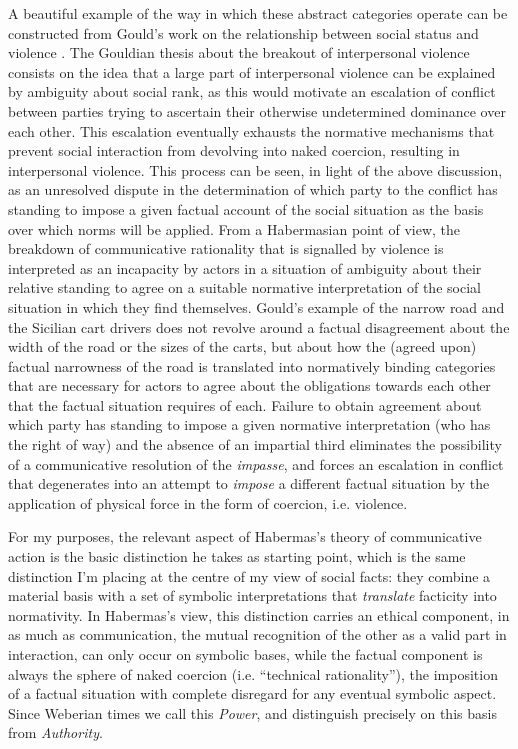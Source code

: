 A beautiful example of the way in which these abstract categories operate can be constructed from Gould's work on the relationship between social status and violence \citep{gould2003a}.
The Gouldian thesis about the breakout of interpersonal violence consists on the idea that a large part of interpersonal violence can be explained by ambiguity about social rank, as this would motivate an escalation of conflict between parties trying to ascertain their otherwise undetermined dominance over each other.
This escalation eventually exhausts the normative mechanisms that prevent social interaction from devolving into naked coercion, resulting in interpersonal violence.
This process can be seen, in light of the above discussion, as an unresolved dispute in the determination of which party to the conflict has standing to impose a given factual account of the social situation as the basis over which norms will be applied.
From a Habermasian point of view, the breakdown of communicative rationality that is signalled by violence is interpreted as an incapacity by actors in a situation of ambiguity about their relative standing to agree on a suitable normative interpretation of the social situation in which they find themselves.
Gould's example of the narrow road and the Sicilian cart drivers does not revolve around a factual disagreement about the width of the road or the sizes of the carts, but about how the (agreed upon) factual narrowness of the road is translated into normatively binding categories that are necessary for actors to agree about the obligations towards each other that the factual situation requires of each.
Failure to obtain agreement about which party has standing to impose a given normative interpretation (who has the right of way) and the absence of an impartial third eliminates the possibility of a communicative resolution of the \emph{impasse}, and forces an escalation in conflict that degenerates into an attempt to \emph{impose} a different factual situation by the application of physical force in the form of coercion, i.e. violence.

For my purposes, the relevant aspect of Habermas's theory of communicative action is the basic distinction he takes as starting point, which is the same distinction I'm placing at the centre of my view of social facts: they combine a material basis with a set of symbolic interpretations that \emph{translate} facticity into normativity.
In Habermas's view, this distinction carries an ethical component, in as much as communication, the mutual recognition of the other as a valid part in interaction, can only occur on symbolic bases, while the factual component is always the sphere of naked coercion (i.e. ``technical rationality''), the imposition of a factual situation with complete disregard for any eventual symbolic aspect.
Since Weberian times we call this \emph{Power}, and distinguish precisely on this basis from \emph{Authority}.

